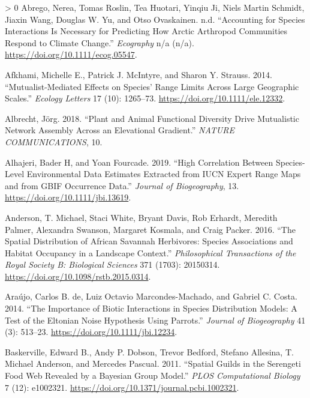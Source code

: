 \documentclass[10pt,oneside]{article}
\newlength{\cslhangindent}
\newenvironment{CSLReferences}[3] %
 {%
  \setlength{\parindent}{0pt}
  \ifodd #1 \everypar{\setlength{\hangindent}{\cslhangindent}}\ignorespaces\fi
  \ifnum #2 > 0
  \setlength{\parskip}{#2\baselineskip}
  \fi
 }%
 {}
\begin{document}
\hypertarget{refs}{}
\begin{CSLReferences}{1}{0}
\leavevmode\hypertarget{ref-AbregoAccSpe}{}%
Abrego, Nerea, Tomas Roslin, Tea Huotari, Yinqiu Ji, Niels Martin
Schmidt, Jiaxin Wang, Douglas W. Yu, and Otso Ovaskainen. n.d.
{``Accounting for Species Interactions Is Necessary for Predicting How
Arctic Arthropod Communities Respond to Climate Change.''}
\emph{Ecography} n/a (n/a). \url{https://doi.org/10.1111/ecog.05547}.

\leavevmode\hypertarget{ref-Afkhami2014MutEff}{}%
Afkhami, Michelle E., Patrick J. McIntyre, and Sharon Y. Strauss. 2014.
{``Mutualist-Mediated Effects on Species' Range Limits Across Large
Geographic Scales.''} \emph{Ecology Letters} 17 (10): 1265--73.
\url{https://doi.org/10.1111/ele.12332}.

\leavevmode\hypertarget{ref-Albrecht2018PlaAni}{}%
Albrecht, Jörg. 2018. {``Plant and Animal Functional Diversity Drive
Mutualistic Network Assembly Across an Elevational Gradient.''}
\emph{NATURE COMMUNICATIONS}, 10.

\leavevmode\hypertarget{ref-Alhajeri2019HigCor}{}%
Alhajeri, Bader H, and Yoan Fourcade. 2019. {``High Correlation Between
Species-Level Environmental Data Estimates Extracted from IUCN Expert
Range Maps and from GBIF Occurrence Data.''} \emph{Journal of
Biogeography}, 13. \url{https://doi.org/10.1111/jbi.13619}.

\leavevmode\hypertarget{ref-Anderson2016SpaDis}{}%
Anderson, T. Michael, Staci White, Bryant Davis, Rob Erhardt, Meredith
Palmer, Alexandra Swanson, Margaret Kosmala, and Craig Packer. 2016.
{``The Spatial Distribution of African Savannah Herbivores: Species
Associations and Habitat Occupancy in a Landscape Context.''}
\emph{Philosophical Transactions of the Royal Society B: Biological
Sciences} 371 (1703): 20150314.
\url{https://doi.org/10.1098/rstb.2015.0314}.

\leavevmode\hypertarget{ref-Araujo2014ImpBio}{}%
Araújo, Carlos B. de, Luiz Octavio Marcondes-Machado, and Gabriel C.
Costa. 2014. {``The Importance of Biotic Interactions in Species
Distribution Models: A Test of the Eltonian Noise Hypothesis Using
Parrots.''} \emph{Journal of Biogeography} 41 (3): 513--23.
\url{https://doi.org/10.1111/jbi.12234}.

\leavevmode\hypertarget{ref-Baskerville2011SpaGui}{}%
Baskerville, Edward B., Andy P. Dobson, Trevor Bedford, Stefano
Allesina, T. Michael Anderson, and Mercedes Pascual. 2011. {``Spatial
Guilds in the Serengeti Food Web Revealed by a Bayesian Group Model.''}
\emph{PLOS Computational Biology} 7 (12): e1002321.
\url{https://doi.org/10.1371/journal.pcbi.1002321}.


\end{CSLReferences}
\end{document}
